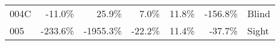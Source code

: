 \begin{table}[!htb]
\begin{tabular}{lrrrrrl}
004C        &   -11.0\% &     25.9\% &                                                 7.0\% &                                                 11.8\% &  -156.8\% &                                                      Blind \\
005         &  -233.6\% &  -1955.3\% &                                               -22.2\% &                                                 11.4\% &   -37.7\% &                                                      Sight \\
\bottomrule
\end{tabular}
\end{table}

